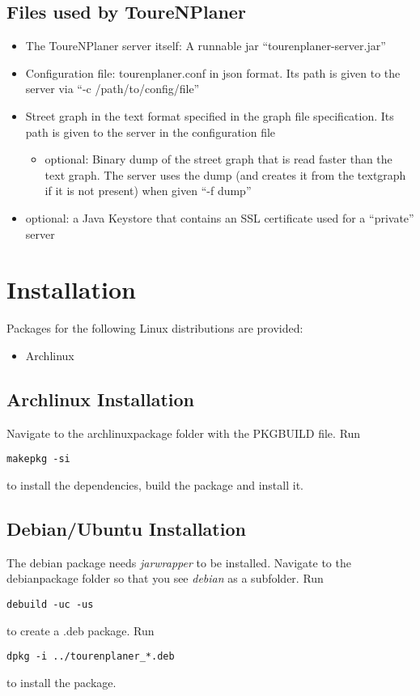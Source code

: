 \documentclass[ngerman,titlepage,parskip=true]{scrartcl}
\begin{document}
	\label{usedfiles}
  \subsection{Files used by ToureNPlaner}
	 \begin{itemize}
	   \item The ToureNPlaner server itself: A runnable jar ``tourenplaner-server.jar''
	   \item Configuration file: tourenplaner.conf in json format. Its path is given to the server via ``-c /path/to/config/file''
	   \item Street graph in the text format specified in the graph file specification. Its path is given to the server in the configuration file
		\begin{itemize}
		  \item optional: Binary dump of the street graph that is read faster than the text graph. The server uses the dump (and creates it from the textgraph if it is not present) when given ``-f dump''
		\end{itemize}
	   \item optional: a Java Keystore that contains an SSL certificate used for a ``private'' server
	 \end{itemize}

\section{Installation}
  Packages for the following Linux distributions are provided:
  \begin{itemize}
    \item Archlinux
  \end{itemize}
  \subsection{Archlinux Installation}
  Navigate to the archlinuxpackage folder with the PKGBUILD file. Run
  \begin{lstlisting}
makepkg -si
  \end{lstlisting}
  to install the dependencies, build the package and install it.
  \subsection{Debian/Ubuntu Installation}
  The debian package needs \textit{jarwrapper} to be installed.
  Navigate to the debianpackage folder so that you see \textit{debian} as a subfolder. Run
  \begin{lstlisting}
debuild -uc -us
  \end{lstlisting}
  to create a .deb package.
  Run
  \begin{lstlisting}
dpkg -i ../tourenplaner_*.deb
  \end{lstlisting}
  to install the package.
  
\end{document}

